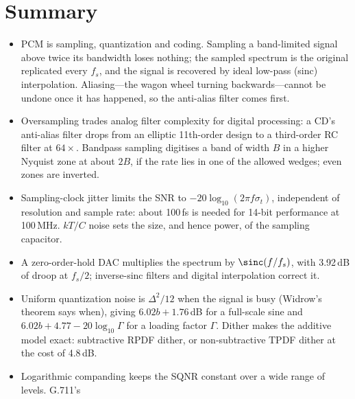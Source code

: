 
\section{Summary}

\begin{itemize}
\item PCM is sampling, quantization and coding. Sampling a band-limited signal above twice its
bandwidth loses nothing; the sampled spectrum is the original replicated every $f_s$, and the
signal is recovered by ideal low-pass (sinc) interpolation. Aliasing---the wagon wheel turning
backwards---cannot be undone once it has happened, so the anti-alias filter comes first.
\item Oversampling trades analog filter complexity for digital processing: a CD's anti-alias
filter drops from an elliptic 11th-order design to a third-order RC filter at $64\times$.
Bandpass sampling digitises a band of width $B$ in a higher Nyquist zone at about $2B$, if the
rate lies in one of the allowed wedges; even zones are inverted.
\item Sampling-clock jitter limits the SNR to $-20\log_{10}(2\pi f\sigma_t)$, independent of
resolution and sample rate: about 100\,fs is needed for 14-bit performance at 100\,MHz.
$kT/C$ noise sets the size, and hence power, of the sampling capacitor.
\item A zero-order-hold DAC multiplies the spectrum by $\sinc(f/f_s)$, with 3.92\,dB of droop at
$f_s/2$; inverse-sinc filters and digital interpolation correct it.
\item Uniform quantization noise is $\Delta^2/12$ when the signal is busy (Widrow's theorem says
when), giving $6.02b+1.76$\,dB for a full-scale sine and $6.02b+4.77-20\log_{10}\Gamma$ for a
loading factor $\Gamma$. Dither makes the additive model exact: subtractive RPDF dither, or
non-subtractive TPDF dither at the cost of 4.8\,dB.
\item Logarithmic companding keeps the SQNR constant over a wide range of levels. G.711's

\end{itemize}
